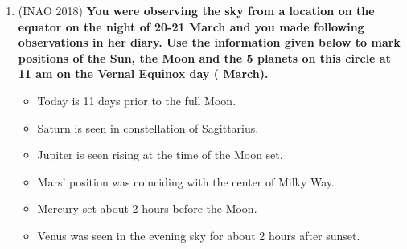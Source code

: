 \documentclass[a4paper,12pt]{extarticle}
\begin{document}
\begin{enumerate}
	
	\item (INAO 2018) \textbf{You were observing the sky from a location on the equator on the night of 20-21 March and you made following observations in her diary. Use the information given below to mark positions of the Sun, the Moon and the 5 planets on this circle at 11 am on the Vernal Equinox day ( March).} \label{INAO18}
	\begin{itemize}
		\item Today is 11 days prior to the full Moon.
		\item Saturn is seen in constellation of Sagittarius.
		\item Jupiter is seen rising at the time of the Moon set.
		\item Mars’ position was coinciding with the center of Milky Way.
		\item Mercury set about 2 hours before the Moon.
		\item Venus was seen in the evening sky for about 2 hours after sunset.
	\end{itemize}
\end{enumerate}
\end{document}
